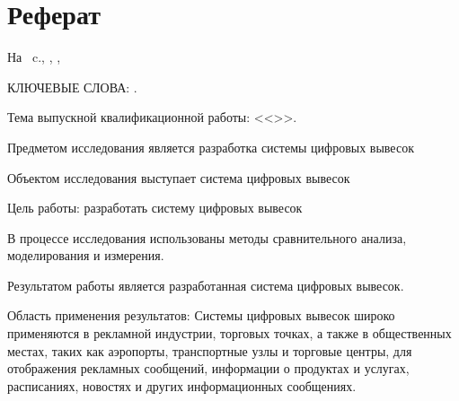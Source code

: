 \chapter*[Count-me]{Реферат} %
\thispagestyle{empty}%
%
%



На ~c.,  
,
,

{\MakeUppercase{Ключевые слова: \keywordsRu}.} %

Тема выпускной квалификационной работы: <<\thesisTitle>>.


\abstractRu %

Предметом исследования является разработка системы цифровых вывесок

Объектом исследования выступает система цифровых вывесок

Цель работы: разработать систему цифровых вывесок

В процессе исследования использованы методы сравнительного анализа, моделирования и измерения.

Результатом работы является разработанная система цифровых вывесок.

Область применения результатов: Системы цифровых вывесок широко применяются в рекламной индустрии, торговых точках, а также в общественных местах, таких как аэропорты, транспортные узлы и торговые центры, для отображения рекламных сообщений, информации о продуктах и услугах, расписаниях, новостях и других информационных сообщениях.

